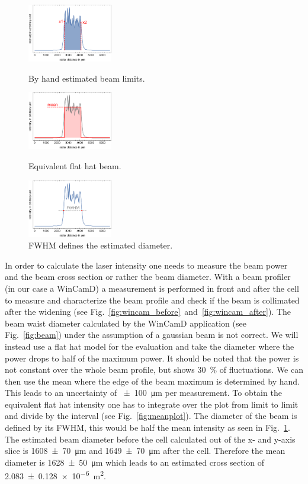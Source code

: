 \begin{figure}
    \includegraphics[width=0.33\textwidth]{dialimitplot}    
    \caption{\label{fig:diaminplot} By hand estimated beam limits.}
    \vspace{1em}
    \includegraphics[width=0.33\textwidth]{meanplot}    
    \caption{\label{fig:meanplot} Equivalent flat hat beam.}
    \vspace{1em}
    \includegraphics[width=0.33\textwidth]{diaplot}    
    \caption{\label{fig:diaplot} FWHM defines the estimated diameter.}
\end{figure}

\bigskip
In order to calculate the laser intensity one needs to measure the beam power and 
the beam cross section or rather the beam diameter. With a beam profiler (in our 
case a WinCamD) a measurement is performed in front and after the cell to measure 
and characterize the beam profile and check if the beam is collimated after the 
widening (see Fig.~\ref{fig:wincam_before}~and~\ref{fig:wincam_after}). 
The beam waist diameter calculated by the WinCamD application (see Fig.~\ref{fig:beam}) 
under the assumption of a gaussian beam is not correct. We will instead use a 
flat hat model for the evaluation and take the diameter where the power drops to 
half of the maximum power. It should be noted that the power is not constant over 
the whole beam profile, but shows \SI{30}{\percent} of fluctuations. We can then 
use the mean where the edge of the beam maximum is determined by hand. This leads 
to an uncertainty of \SI{+-100}{\micro\meter} per measurement. To obtain the 
equivalent flat hat intensity one has to integrate over the plot from limit to 
limit and divide by the interval (see Fig.~\ref{fig:meanplot}). The diameter of 
the beam is defined by its FWHM, this would be half the mean intensity as seen 
in Fig.~\ref{fig:diaplot}. The estimated beam diameter before the cell calculated 
out of the x- and y-axis slice is \SI[separate-uncertainty]{1608+-70}{\micro\meter} 
and \SI[separate-uncertainty]{1649+-70}{\micro\meter} after the cell. Therefore
the mean diameter is \SI[separate-uncertainty]{1628+-50}{\micro\meter} which
leads to an estimated cross section of
\SI[separate-uncertainty]{2.083+-0.128e-6}{\meter\squared}.


